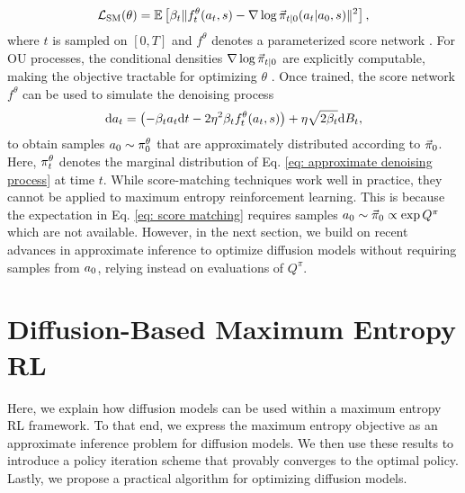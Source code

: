 \begin{equation}
\label{eq: score matching}
\mathcal{L}_{\text{SM}}(\theta) = \mathbb{E}\left[\beta_t\|f^{\theta}_t(a_t,s) - \nabla \log \vec{\pi}_{t|0}(a_t|a_0,s) \|^2\right],
\end{equation}
where $t$ is sampled on $[0,T]$ and $f^{\theta}$ denotes a parameterized score network \cite{hyvarinen2005estimation,vincent2011connection}. For OU processes, the conditional densities $\nabla \log \vec{\pi}_{t|0}$ are explicitly computable, making the objective tractable for optimizing $\theta$ \cite{song2021scorebased}. Once trained, the score network $f^{\theta}$ can be used to simulate the denoising process 
\begin{equation}
\label{eq: approximate denoising process}
        \mathrm{d} a_t  = \left(-\beta_t a_t \mathrm{d} t - 2\eta^2\beta_t f^{\theta}_t(a_t,s)\right) + \eta\sqrt{2\beta_t} \mathrm{d} B_t,
\end{equation}
to obtain samples $a_0 \sim \pi^{\theta}_0$ that are approximately distributed according to $\vec{\pi}_0$. Here, $\pi^{\theta}_t$ denotes the marginal distribution of Eq. \ref{eq: approximate denoising process} at time $t$.
While score-matching techniques work well in practice, they cannot be applied to maximum entropy reinforcement learning. 
This is because the expectation in Eq. \ref{eq: score matching} requires samples $a_0 \sim \vec{\pi}_0 \propto \exp Q^{\pi}$ which are not available. However, in the next section, we build on recent advances in approximate inference to optimize diffusion models without requiring samples from $a_0$, relying instead on evaluations of  $Q^{\pi}$.

%
%
%
\section{Diffusion-Based Maximum Entropy RL}
\label{sec: Diffusion-Based Maximum Entropy RL}
Here, we explain how diffusion models can be used within a maximum entropy RL framework. To that end, we express the maximum entropy objective as an approximate inference problem for diffusion models. We then use these results to introduce a policy iteration scheme that provably converges to the optimal policy. Lastly, we propose a practical algorithm for optimizing diffusion models.
